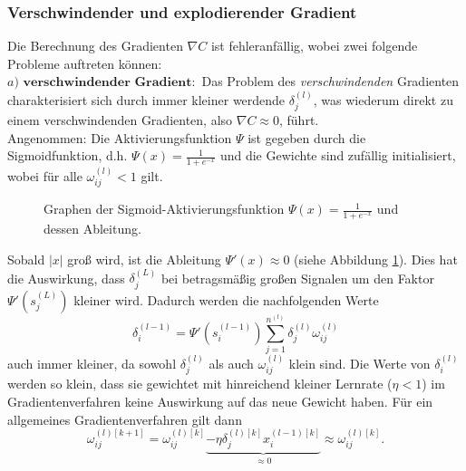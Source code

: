 \subsubsection{Verschwindender und explodierender Gradient}
Die Berechnung des Gradienten $\nabla C$ ist fehleranfällig, wobei zwei folgende Probleme auftreten können: \\
$a)$ $\textbf{verschwindender Gradient}:$
Das Problem des {\em verschwindenden} Gradienten charakterisiert sich durch immer kleiner werdende $\delta_j^{(l)}$, was wiederum
direkt zu einem verschwindenden Gradienten, also $\nabla C \approx 0$, führt. \\
Angenommen: Die Aktivierungsfunktion $\Psi$ ist gegeben durch die Sigmoidfunktion, d.h. $\Psi(x) =\frac{1}{1+e^{-x}}$ und
die Gewichte sind zufällig initialisiert, wobei für alle $\omega_{ij}^{(l)}<1$ gilt.\\
\begin{figure}
    \begin{center}
        \caption{Graphen der Sigmoid-Aktivierungsfunktion $\Psi(x)=\frac{1}{1+e^{-x}}$ und dessen Ableitung.}
        \label{sigmoid-figure}
    \end{center}
\end{figure}
Sobald $|x|$ groß wird, ist die Ableitung $\Psi'(x) \approx 0$ (siehe Abbildung \ref{sigmoid-figure}). Dies hat die Auswirkung, dass
$\delta_j^{(L)}$ bei betragsmäßig großen Signalen um den Faktor $\Psi'(s_j^{(L)})$ kleiner wird. Dadurch werden die
nachfolgenden Werte
\[
    \delta_i^{(l-1)}=\Psi'(s_i^{(l-1)})\sum\limits_{j=1}^{n^{(l)}}\delta_j^{(l)} \omega_{ij}^{(l)}
\]
auch immer kleiner, da sowohl $\delta_j^{(l)}$ als auch $\omega_{ij}^{(l)}$ klein sind. Die Werte von $\delta_i^{(l)}$ werden
so klein, dass sie gewichtet mit hinreichend kleiner Lernrate ($\eta <1$) im Gradientenverfahren keine Auswirkung
auf das neue Gewicht haben. Für ein allgemeines Gradientenverfahren gilt dann
\[
    \omega_{ij}^{(l)[k+1]} = \omega_{ij}^{(l)[k]}\underbrace{-\eta \delta_j^{(l)[k]}x_i^{(l-1)[k]}}_{\approx 0}\approx \omega_{ij}^{(l)[k]}.
\]
